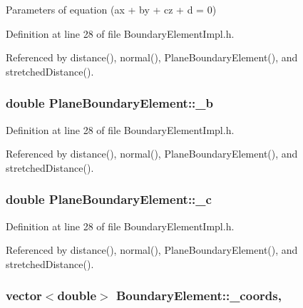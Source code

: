 Parameters of equation (ax + by + cz + d = 0) 



Definition at line 28 of file Boundary\+Element\+Impl.\+h.



Referenced by distance(), normal(), Plane\+Boundary\+Element(), and stretched\+Distance().

\hypertarget{classPlaneBoundaryElement_a1725bf5a9d6a0d6df973bbf834f64afd}{
\subsubsection[{\+\_\+b}]{\setlength{\rightskip}{0pt plus 5cm}double Plane\+Boundary\+Element\+::\+\_\+b\hspace{0.3cm}{\ttfamily [private]}}}\label{classPlaneBoundaryElement_a1725bf5a9d6a0d6df973bbf834f64afd}


Definition at line 28 of file Boundary\+Element\+Impl.\+h.



Referenced by distance(), normal(), Plane\+Boundary\+Element(), and stretched\+Distance().

\hypertarget{classPlaneBoundaryElement_ac76ace6d0b2da7e27cba5afd85ae8935}{
\subsubsection[{\+\_\+c}]{\setlength{\rightskip}{0pt plus 5cm}double Plane\+Boundary\+Element\+::\+\_\+c\hspace{0.3cm}{\ttfamily [private]}}}\label{classPlaneBoundaryElement_ac76ace6d0b2da7e27cba5afd85ae8935}


Definition at line 28 of file Boundary\+Element\+Impl.\+h.



Referenced by distance(), normal(), Plane\+Boundary\+Element(), and stretched\+Distance().

\hypertarget{classBoundaryElement_ab51302e10e3e2def98438234ba5bf801}{
\subsubsection[{\+\_\+coords}]{\setlength{\rightskip}{0pt plus 5cm}vector$<$double$>$ Boundary\+Element\+::\+\_\+coords\hspace{0.3cm}{\ttfamily [protected]}, {\ttfamily [inherited]}}}\label{classBoundaryElement_ab51302e10e3e2def98438234ba5bf801}



